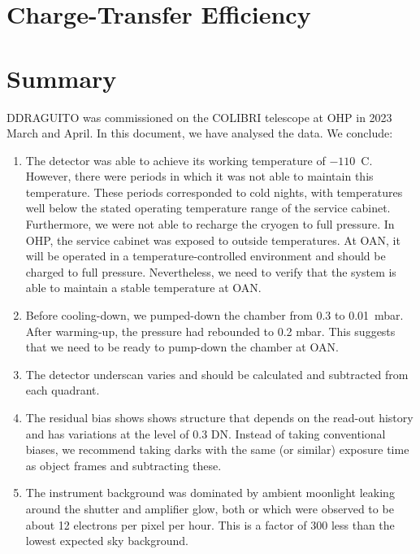 \documentclass{article}
\begin{document}
\clearpage
\section{Charge-Transfer Efficiency}

\clearpage
\section{Summary}

DDRAGUITO was commissioned on the COLIBRI telescope at OHP in 2023 March and April. In this document, we have analysed the data. We conclude:

\begin{enumerate}

\item The detector was able to achieve its working temperature of $-110$~C. However, there were periods in which it was not able to maintain this temperature. These periods corresponded to cold nights, with temperatures well below the stated operating temperature range of the service cabinet. Furthermore, we were not able to recharge the cryogen to full pressure. In OHP, the service cabinet was exposed to outside temperatures. At OAN, it will be operated in a temperature-controlled environment and should be charged to full pressure. Nevertheless, we need to verify that the system is able to maintain a stable temperature at OAN.

\item Before cooling-down, we pumped-down the chamber from 0.3 to 0.01~mbar. After warming-up, the pressure had rebounded to 0.2 mbar. This suggests that we need to be ready to pump-down the chamber at OAN.

\item The detector underscan varies and should be calculated and subtracted from each quadrant.

\item The residual bias shows shows structure that depends on the read-out history and has variations at the level of 0.3 DN. Instead of taking conventional biases, we recommend taking darks with the same (or similar) exposure time as object frames and subtracting these.

\item The instrument background was dominated by ambient moonlight leaking around the shutter and amplifier glow, both or which were observed to be about 12 electrons per pixel per hour. This is a factor of 300 less than the lowest expected sky background.


\end{enumerate}
\end{document}
